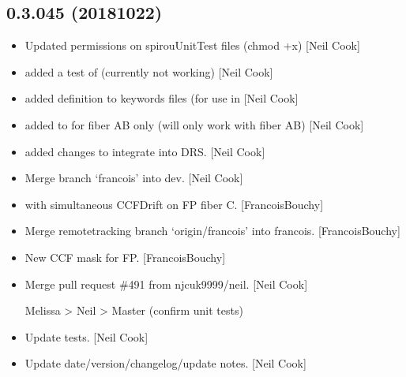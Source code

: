 \documentclass[a4paper,10pt,english]{report}
\begin{document}
\subsection{0.3.045 (2018\sphinxhyphen{}10\sphinxhyphen{}22)}
\label{\detokenize{misc/changelog:id306}}\begin{itemize}
\item {} 
Updated permissions on spirouUnitTest files (chmod +x) {[}Neil Cook{]}

\item {} 
 \sphinxhyphen{} added a test of  (currently
not working) {[}Neil Cook{]}

\item {} 
 \sphinxhyphen{} added  definition to keywords files
(for use in  {[}Neil Cook{]}

\item {} 
 \sphinxhyphen{} added  to  \sphinxhyphen{}
for fiber AB only (will only work with fiber AB) {[}Neil Cook{]}

\item {} 
 \sphinxhyphen{} added changes to integrate into DRS. {[}Neil
Cook{]}

\item {} 
Merge branch ‘francois’ into dev. {[}Neil Cook{]}

\item {} 
 with simultaneous CCFDrift on FP fiber C.
{[}FrancoisBouchy{]}

\item {} 
Merge remote\sphinxhyphen{}tracking branch ‘origin/francois’ into francois.
{[}FrancoisBouchy{]}

\item {} 
New CCF mask for FP. {[}FrancoisBouchy{]}

\item {} 
Merge pull request \#491 from njcuk9999/neil. {[}Neil Cook{]}

Melissa \textendash{}\textgreater{} Neil \textendash{}\textgreater{} Master (confirm unit tests)

\item {} 
Update tests. {[}Neil Cook{]}

\item {} 
Update date/version/changelog/update notes. {[}Neil Cook{]}

\end{itemize}
\end{document}
